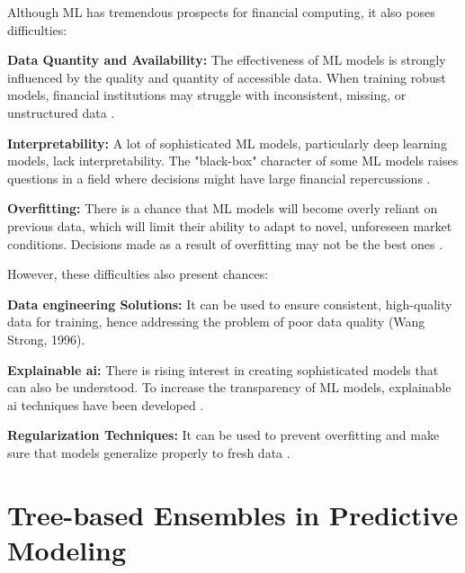 \smallskip

Although ML has tremendous prospects for financial computing, it also poses difficulties:

\textbf{Data Quantity and Availability:}
 The effectiveness of ML models is strongly influenced by the quality and quantity of accessible data. When training robust models, financial institutions may struggle with inconsistent, missing, or unstructured data \citep{DBLP:journals/mansci/BaesensSMV03}.

\smallskip
 
\textbf{Interpretability: }
A lot of sophisticated ML models, particularly deep learning models, lack interpretability. The "black-box" character of some ML models raises questions in a field where decisions might have large financial repercussions \citep{DBLP:conf/kdd/Ribeiro0G16}.

\smallskip

\textbf{Overfitting:} 
There is a chance that ML models will become overly reliant on previous data, which will limit their ability to adapt to novel, unforeseen market conditions. Decisions made as a result of overfitting may not be the best ones \citep{DBLP:journals/jcisd/HawkinsBM03}.

\smallskip

However, these difficulties also present chances:

\smallskip

\textbf{Data engineering Solutions:} It can be used to ensure consistent, high-quality data for training, hence addressing the problem of poor data quality (Wang  Strong, 1996).

\smallskip

\textbf{Explainable \gls{ai}:} There is rising interest in creating sophisticated models that can also be understood. To increase the transparency of ML models, explainable \gls{ai}  techniques have been developed \citep{doshivelez2017rigorous}.

\smallskip

\textbf{Regularization Techniques:} It can be used to prevent overfitting and make sure that models generalize properly to fresh data \citep{10.1145/1015330.1015435}.

\goodbreak
\section{Tree-based Ensembles in Predictive Modeling}
\smallskip

\goodbreak

